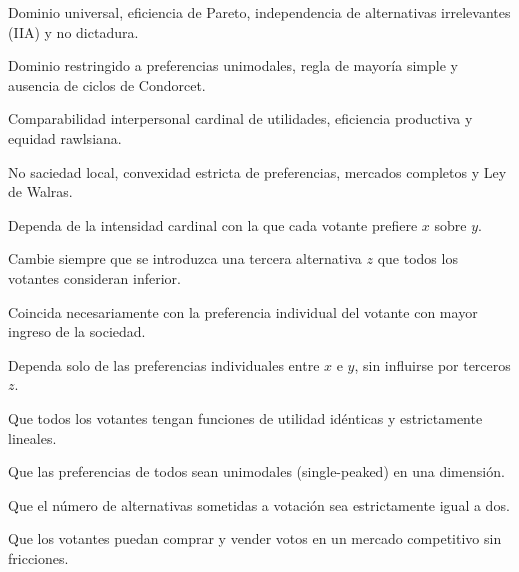 \begin{opts}
    \item Dominio universal, eficiencia de Pareto, independencia de alternativas irrelevantes (IIA) y no dictadura.
    \item Dominio restringido a preferencias unimodales, regla de mayoría simple y ausencia de ciclos de Condorcet.
    \item Comparabilidad interpersonal cardinal de utilidades, eficiencia productiva y equidad rawlsiana.
    \item No saciedad local, convexidad estricta de preferencias, mercados completos y Ley de Walras.
\end{opts}

\begin{opts}
    \item Dependa de la intensidad cardinal con la que cada votante prefiere $x$ sobre $y$.
    \item Cambie siempre que se introduzca una tercera alternativa $z$ que todos los votantes consideran inferior.
    \item Coincida necesariamente con la preferencia individual del votante con mayor ingreso de la sociedad.
    \item Dependa solo de las preferencias individuales entre $x$ e $y$, sin influirse por terceros $z$.
\end{opts}

\begin{opts}
    \item Que todos los votantes tengan funciones de utilidad idénticas y estrictamente lineales.
    \item Que las preferencias de todos sean unimodales (single-peaked) en una dimensión.
    \item Que el número de alternativas sometidas a votación sea estrictamente igual a dos.
    \item Que los votantes puedan comprar y vender votos en un mercado competitivo sin fricciones.
\end{opts}

